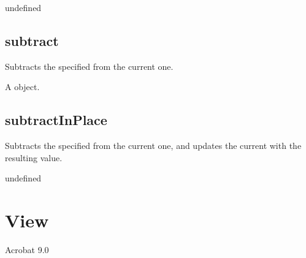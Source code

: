\documentclass[letterpaper,12pt,english,openany,oneside]{sphinxmanual}
\begin{document}
\label{\detokenize{JS_3D_API:section-141}}\label{\detokenize{JS_3D_API:returns-143}}

undefined


\subsection{subtract}
\label{\detokenize{JS_3D_API:subtract}}
Subtracts the specified  from the current one.

\label{\detokenize{JS_3D_API:syntax-143}}

\begin{sphinxVerbatim}[commandchars=\\\{\}]
\end{sphinxVerbatim}
\label{\detokenize{JS_3D_API:parameters-104}}

\label{\detokenize{JS_3D_API:section-142}}\label{\detokenize{JS_3D_API:returns-144}}

A  object.


\subsection{subtractInPlace}
\label{\detokenize{JS_3D_API:subtractinplace}}
Subtracts the specified  from the current one, and updates the current  with the resulting value.

\label{\detokenize{JS_3D_API:syntax-144}}

\begin{sphinxVerbatim}[commandchars=\\\{\}]
\end{sphinxVerbatim}
\label{\detokenize{JS_3D_API:parameters-105}}

\label{\detokenize{JS_3D_API:section-143}}\label{\detokenize{JS_3D_API:returns-145}}

undefined


\section{View}
\label{\detokenize{JS_3D_API:view}}
Acrobat 9.0
\end{document}
